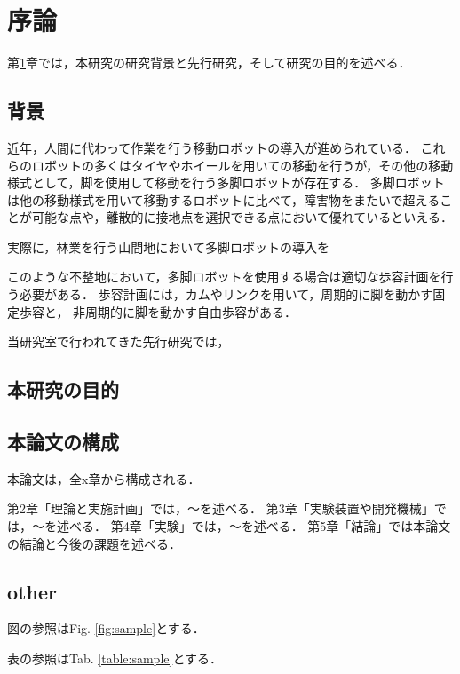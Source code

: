 ﻿%

\chapter{序論}\label{chapter:序論}
第\ref{chapter:序論}章では，本研究の研究背景と先行研究，そして研究の目的を述べる．


\section{背景}
近年，人間に代わって作業を行う移動ロボットの導入が進められている．
これらのロボットの多くはタイヤやホイールを用いての移動を行うが，その他の移動様式として，脚を使用して移動を行う多脚ロボットが存在する．
多脚ロボットは他の移動様式を用いて移動するロボットに比べて，障害物をまたいで超えることが可能な点や，離散的に接地点を選択できる点において優れているといえる．

実際に，林業を行う山間地において多脚ロボットの導入を

このような不整地において，多脚ロボットを使用する場合は適切な歩容計画を行う必要がある．
歩容計画には，カムやリンクを用いて，周期的に脚を動かす固定歩容と，
非周期的に脚を動かす自由歩容がある．

当研究室で行われてきた先行研究では，
\section{本研究の目的}


\section{本論文の構成}
本論文は，全x章から構成される．

第2章「理論と実施計画」では，～を述べる．
第3章「実験装置や開発機械」では，～を述べる．
第4章「実験」では，～を述べる．
第5章「結論」では本論文の結論と今後の課題を述べる．

\section{other}
図の参照はFig. \ref{fig:sample}とする．

表の参照はTab. \ref{table:sample}とする．

